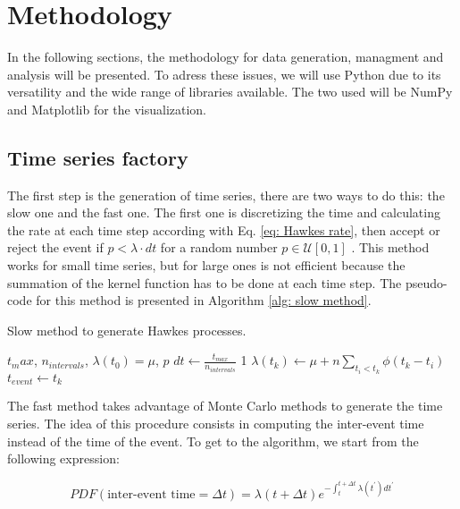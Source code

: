 \chapter{Methodology}\label{ch:metodologia}

In the following sections, the methodology for data generation, managment and analysis will be presented. To adress these issues, we will use Python \cite{McKinney,VanderPlas} due to 
its versatility and the wide range of libraries available. The two used will be NumPy \cite{numpy} and Matplotlib \cite{matplotlib} for the visualization.
 
\section{Time series factory}\label{sec:time_series_factory}

The first step is the generation of time series, there are two ways to do this: the slow one and the fast one. The first one is discretizing the time and calculating the rate at each time step
according with Eq. \ref{eq: Hawkes rate}, then accept or reject the event if $p<\lambda \cdot dt$ for a random number $p\in \mathcal{U}[0,1]$ . 
This method works for small time series, but for large ones is not efficient because the summation of the kernel function has to be done at each time step. The pseudo-code for this method is
presented in Algorithm \ref{alg: slow method}.

\begin{algorithm}
    \caption{Slow method to generate Hawkes processes.}\label{alg: slow method}
    \begin{algorithmic}
        \Require $t_max$, $n_{intervals}$, $\lambda(t_0)=\mu$, $p$
        \State $dt \gets \frac{t_{max}}{n_{intervals}}$
        1
            \State $\lambda(t_k) \gets \mu + n\sum_{t_i<t_k}\phi(t_k-t_i)$ 
                \State $t_{event} \gets t_k$
            \EndIf
        \EndFor
        \end{algorithmic}
\end{algorithm}

The fast method takes advantage of Monte Carlo methods \cite{barbu2020monte} to generate the time series. The idea of this procedure consists in computing the inter-event time instead 
of the time of the event. To get to the algorithm, we start from the following expression:

\begin{equation}
    PDF(\text{inter-event time}=\Delta t) = \lambda(t+\Delta t) e^{-\int_t^{t+\Delta t}\lambda(t^\prime)dt^\prime} 
    \label{eq: inter-event time PDF}
\end{equation}


